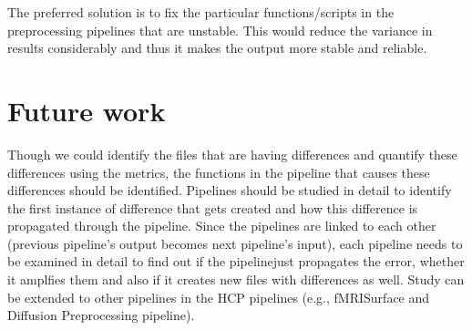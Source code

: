 The preferred solution is to fix the particular functions/scripts in the preprocessing pipelines that are unstable. This would reduce the variance in results considerably and thus it makes the output more stable and reliable.

\section{Future work}
Though we could identify the files that are having differences and quantify these differences using the metrics, the functions in the pipeline that causes these differences should be identified.
Pipelines should be studied in detail to identify the first instance of difference that gets created and how this difference is propagated through the pipeline.
Since the pipelines are linked to each other (previous pipeline's output becomes next pipeline's input), each pipeline needs to be examined in detail to find out if the pipelinejust propagates the error, whether it amplfies them and also if it creates new files with differences as well. 
Study can be extended to other pipelines in the HCP pipelines (e.g., fMRISurface and Diffusion Preprocessing pipeline).
